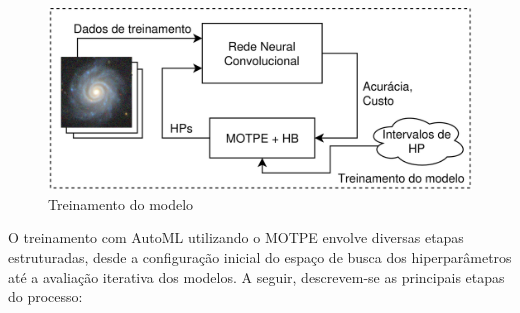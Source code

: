 \begin{figure}[!ht]
  \centering
  \caption{Treinamento do modelo}
  \label{fig:treinamento}
  \includegraphics[width=\linewidth]{figures/treinamento.png}
\end{figure}

O treinamento com AutoML utilizando o MOTPE envolve diversas etapas estruturadas, desde a configuração inicial do espaço de busca dos hiperparâmetros até a avaliação iterativa dos modelos. A seguir, descrevem-se as principais etapas do processo:

